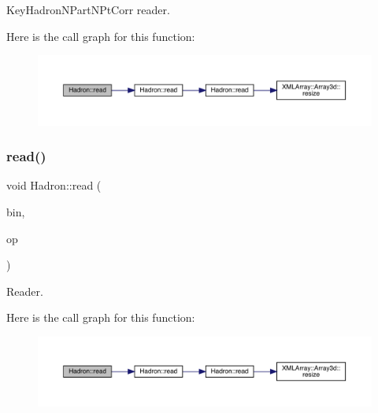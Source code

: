 Key\+Hadron\+N\+Part\+N\+Pt\+Corr reader. 

Here is the call graph for this function\+:\nopagebreak
\begin{figure}[H]
\begin{center}
\leavevmode
\includegraphics[width=350pt]{d1/daf/namespaceHadron_a9478eee791b9cb2c8523893a334602e2_cgraph}
\end{center}
\end{figure}
\mbox{\label{namespaceHadron_a02133bc62e51d4baa57fb5ba0742ff43}} 
\subsubsection{\texorpdfstring{read()}{read()}\hspace{0.1cm}{\footnotesize\ttfamily [52/94]}}
{\footnotesize\ttfamily void Hadron\+::read (\begin{DoxyParamCaption}\item[{\mbox{\hyperlink{classADATIO_1_1BinaryReader}{Binary\+Reader}} \&}]{bin,  }\item[{\mbox{\hyperlink{structHadron_1_1KeySingleHadronQuarkSpin__t}{Key\+Single\+Hadron\+Quark\+Spin\+\_\+t}} \&}]{op }\end{DoxyParamCaption})}



Reader. 

Here is the call graph for this function\+:\nopagebreak
\begin{figure}[H]
\begin{center}
\leavevmode
\includegraphics[width=350pt]{d1/daf/namespaceHadron_a02133bc62e51d4baa57fb5ba0742ff43_cgraph}
\end{center}
\end{figure}
\mbox{\label{namespaceHadron_a475e00d642e0578e7bbe956bbbf37aac}} 
